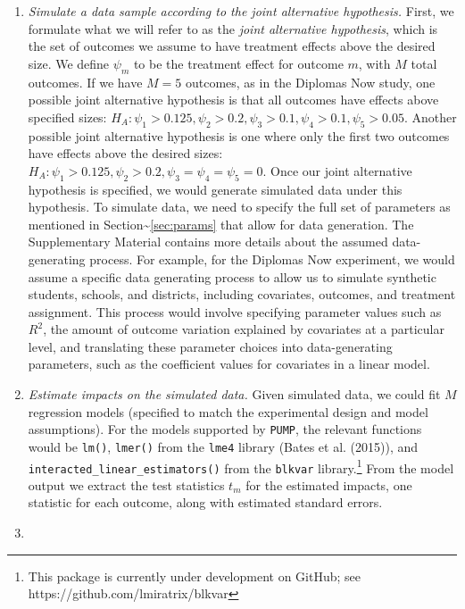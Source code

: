 \documentclass[
]{article}
\begin{document}
\begin{enumerate}
\def\labelenumi{\arabic{enumi}.}
\item
  \emph{Simulate a data sample according to the joint alternative
  hypothesis.} First, we formulate what we will refer to as the
  \emph{joint alternative hypothesis}, which is the set of outcomes we
  assume to have treatment effects above the desired size. We define
  \(\psi_m\) to be the treatment effect for outcome \(m\), with \(M\)
  total outcomes. If we have \(M = 5\) outcomes, as in the Diplomas Now
  study, one possible joint alternative hypothesis is that all outcomes
  have effects above specified sizes:
  \(H_A: \psi_1 > 0.125, \psi_2 > 0.2, \psi_3 > 0.1, \psi_4 > 0.1, \psi_5 > 0.05\).
  Another possible joint alternative hypothesis is one where only the
  first two outcomes have effects above the desired sizes:
  \(H_A: \psi_1 > 0.125, \psi_2 > 0.2, \psi_3 = \psi_4 = \psi_5 = 0\).
  Once our joint alternative hypothesis is specified, we would generate
  simulated data under this hypothesis. To simulate data, we need to
  specify the full set of parameters as mentioned in
  Section\textasciitilde{}\ref{sec:params} that allow for data
  generation. The Supplementary Material contains more details about the
  assumed data-generating process. For example, for the Diplomas Now
  experiment, we would assume a specific data generating process to
  allow us to simulate synthetic students, schools, and districts,
  including covariates, outcomes, and treatment assignment. This process
  would involve specifying parameter values such as \(R^2\), the amount
  of outcome variation explained by covariates at a particular level,
  and translating these parameter choices into data-generating
  parameters, such as the coefficient values for covariates in a linear
  model.
\item
  \emph{Estimate impacts on the simulated data.} Given simulated data,
  we could fit \(M\) regression models (specified to match the
  experimental design and model assumptions). For the models supported
  by \texttt{PUMP}, the relevant functions would be \texttt{lm()},
  \texttt{lmer()} from the \texttt{lme4} library (Bates et al. (2015)),
  and \texttt{interacted\_linear\_estimators()} from the \texttt{blkvar}
  library.\footnote{This package is currently under development on GitHub; see https://github.com/lmiratrix/blkvar}
  From the model output we extract the test statistics \(t_m\) for the
  estimated impacts, one statistic for each outcome, along with
  estimated standard errors.
\item

\end{enumerate}
\end{document}
